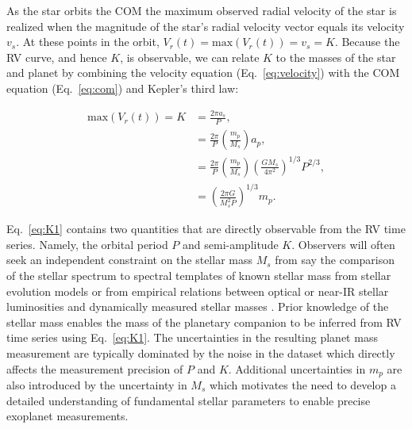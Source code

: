\noindent As the star orbits the COM the maximum observed radial velocity of the star
is realized when the magnitude of the star's radial velocity vector
equals its velocity $v_s$. At these points in the orbit, $V_r(t)=\text{max}(V_r(t))=v_s=K$.
Because the RV curve, and hence $K$, is observable, 
we can relate $K$ to the masses of the star and planet by combining the velocity 
equation (Eq.~\ref{eq:velocity}) with the COM equation (Eq.~\ref{eq:com})
and Kepler's third law:

\begin{align}
\mathrm{max}(V_r(t)) = K &= \frac{2\pi a_s}{P}, \\
&= \frac{2\pi}{P} \left( \frac{m_p}{M_s} \right) a_p, \\
&= \frac{2\pi}{P} \left( \frac{m_p}{M_s} \right) \left( \frac{GM_s}{4\pi^2} \right)^{1/3} P^{2/3}, \\
&= \left( \frac{2\pi G}{M_s^2 P} \right)^{1/3} m_p. \label{eq:K1}
\end{align}

Eq.~\ref{eq:K1} contains two quantities that are directly observable from the RV time series.
Namely, the orbital period $P$ and semi-amplitude $K$. Observers will often seek an independent
constraint on the stellar mass $M_s$ from say the comparison of the stellar spectrum to
spectral templates of known stellar mass from stellar evolution models
\citep[e.g.][]{muirhead12} or from
empirical relations between optical or near-IR stellar luminosities and dynamically
measured stellar masses \citep[e.g.][]{benedict16,mann19}. Prior knowledge of the
stellar mass enables the mass of the planetary companion to be inferred from RV time series
using Eq.~\ref{eq:K1}.
The uncertainties in the resulting planet mass 
measurement are typically dominated by the noise in the dataset which directly affects the
measurement precision of $P$ and $K$. Additional uncertainties in $m_p$ are also introduced by
the uncertainty in $M_s$ which motivates the need to develop a detailed understanding of
fundamental stellar parameters to enable precise exoplanet measurements. \\

